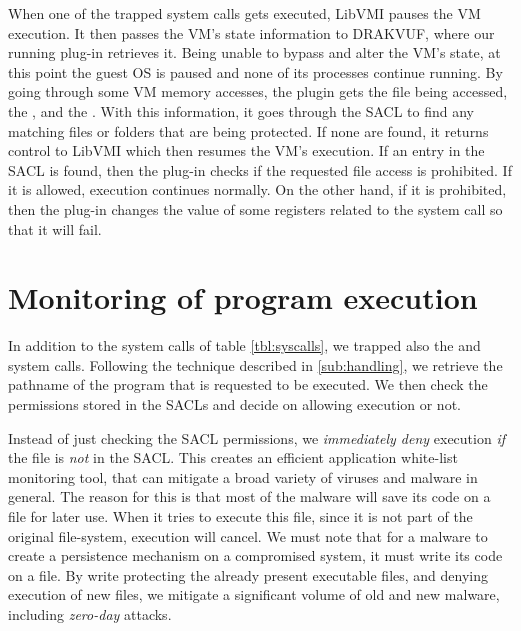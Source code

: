 \par When one of the trapped system calls gets executed, LibVMI pauses the \ac{VM} execution. It then passes the \ac{VM}'s state information to DRAKVUF, where our running plug-in retrieves it. Being unable to bypass and alter the \ac{VM}'s state, at this point the guest \ac{OS} is paused and none of its processes continue running. By going through some \ac{VM} memory accesses, the plugin gets the file being accessed, the , and the . With this information, it goes through the \ac{SACL} to find any matching files or folders that are being protected. If none are found, it returns control to LibVMI which then resumes the \ac{VM}'s execution. If an entry in the \ac{SACL} is found, then the plug-in checks if the requested file access is prohibited. If it is allowed, execution continues normally. On the other hand, if it is prohibited,  then the plug-in changes the value of some registers related to the system call so that it will fail.


\section{Monitoring of program execution}

\par In addition to the system calls of table \ref{tbl:syscalls}, we trapped also the  and  system calls. Following the technique described in \ref{sub:handling}, we retrieve the pathname of the program that is requested to be executed. We then check the permissions stored in the \acp{SACL} and decide on allowing execution or not.

\par Instead of just checking the \ac{SACL} permissions, we \emph{immediately deny} execution \emph{if} the file is \emph{not} in the \ac{SACL}. This creates an efficient application white-list monitoring tool, that can mitigate a broad variety of viruses and malware in general. The reason for this is that most of the malware will save its code on a file for later use. When it tries to execute this file, since it is not part of the original file-system, execution will cancel. We must note that for a malware to create a persistence mechanism on a compromised system, it must write its code on a file. By write protecting the already present executable files, and denying execution of new files, we mitigate a significant volume of old and new malware, including \emph{zero-day} attacks.



